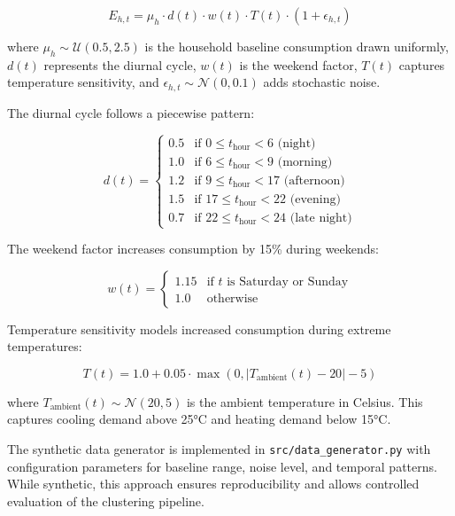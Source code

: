 \documentclass[11pt]{article}
\begin{document}
\begin{equation}
E_{h,t} = \mu_h \cdot d(t) \cdot w(t) \cdot T(t) \cdot (1 + \epsilon_{h,t})
\end{equation}

where $\mu_h \sim \mathcal{U}(0.5, 2.5)$ is the household baseline consumption drawn uniformly, $d(t)$ represents the diurnal cycle, $w(t)$ is the weekend factor, $T(t)$ captures temperature sensitivity, and $\epsilon_{h,t} \sim \mathcal{N}(0, 0.1)$ adds stochastic noise.

The diurnal cycle follows a piecewise pattern:

\begin{equation}
d(t) = \begin{cases}
0.5 & \text{if } 0 \leq t_{\text{hour}} < 6 \text{ (night)} \\
1.0 & \text{if } 6 \leq t_{\text{hour}} < 9 \text{ (morning)} \\
1.2 & \text{if } 9 \leq t_{\text{hour}} < 17 \text{ (afternoon)} \\
1.5 & \text{if } 17 \leq t_{\text{hour}} < 22 \text{ (evening)} \\
0.7 & \text{if } 22 \leq t_{\text{hour}} < 24 \text{ (late night)}
\end{cases}
\end{equation}

The weekend factor increases consumption by 15\% during weekends:

\begin{equation}
w(t) = \begin{cases}
1.15 & \text{if } t \text{ is Saturday or Sunday} \\
1.0 & \text{otherwise}
\end{cases}
\end{equation}

Temperature sensitivity models increased consumption during extreme temperatures:

\begin{equation}
T(t) = 1.0 + 0.05 \cdot \max(0, |T_{\text{ambient}}(t) - 20| - 5)
\end{equation}

where $T_{\text{ambient}}(t) \sim \mathcal{N}(20, 5)$ is the ambient temperature in Celsius. This captures cooling demand above 25°C and heating demand below 15°C.

The synthetic data generator is implemented in \texttt{src/data\_generator.py} with configuration parameters for baseline range, noise level, and temporal patterns. While synthetic, this approach ensures reproducibility and allows controlled evaluation of the clustering pipeline.
\end{document}
